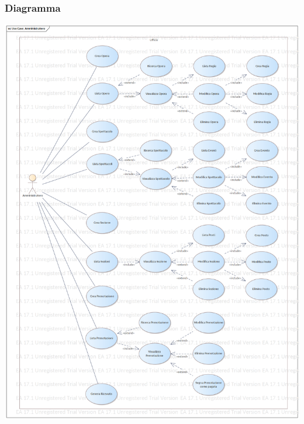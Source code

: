 \documentclass{article}
\begin{document}
            \subsubsection{Diagramma}
                \includegraphics[width=\textwidth]{imgs/use_case/amministratore}
\end{document}
